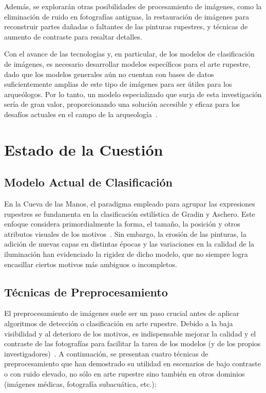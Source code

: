 Además, se explorarán otras posibilidades de procesamiento de imágenes, como la eliminación de ruido en fotografías antiguas, la restauración de imágenes para reconstruir partes dañadas o faltantes de las pinturas rupestres, y técnicas de aumento de contraste para resaltar detalles.

Con el avance de las tecnologías y, en particular, de los modelos de clasificación de imágenes, es necesario desarrollar modelos específicos para el arte rupestre, dado que los modelos generales aún no cuentan con bases de datos suficientemente amplias de este tipo de imágenes para ser útiles para los arqueólogos. Por lo tanto, un modelo especializado que surja de esta investigación sería de gran valor, proporcionando una solución accesible y eficaz para los desafíos actuales en el campo de la arqueología~\cite{aschero2018}.

\section{Estado de la Cuestión}

\subsection{Modelo Actual de Clasificación}

En la Cueva de las Manos, el paradigma empleado para agrupar las expresiones rupestres se fundamenta en la clasificación estilística de Gradin y Aschero. Este enfoque considera primordialmente la forma, el tamaño, la posición y otros atributos visuales de los motivos~\cite{gradin1978,gradin1979,aschero2010,aschero2012,aschero2018,aschero2018b}. Sin embargo, la erosión de las pinturas, la adición de nuevas capas en distintas épocas y las variaciones en la calidad de la iluminación han evidenciado la rigidez de dicho modelo, que no siempre logra encasillar ciertos motivos más ambiguos o incompletos.

\subsection{Técnicas de Preprocesamiento}

El preprocesamiento de imágenes suele ser un paso crucial antes de aplicar algoritmos de detección o clasificación en arte rupestre. Debido a la baja visibilidad y al deterioro de los motivos, es indispensable mejorar la calidad y el contraste de las fotografías para facilitar la tarea de los modelos (y de los propios investigadores)~\cite{li2022}. A continuación, se presentan cuatro técnicas de preprocesamiento que han demostrado su utilidad en escenarios de bajo contraste o con ruido elevado, no sólo en arte rupestre sino también en otros dominios (imágenes médicas, fotografía subacuática, etc.):

